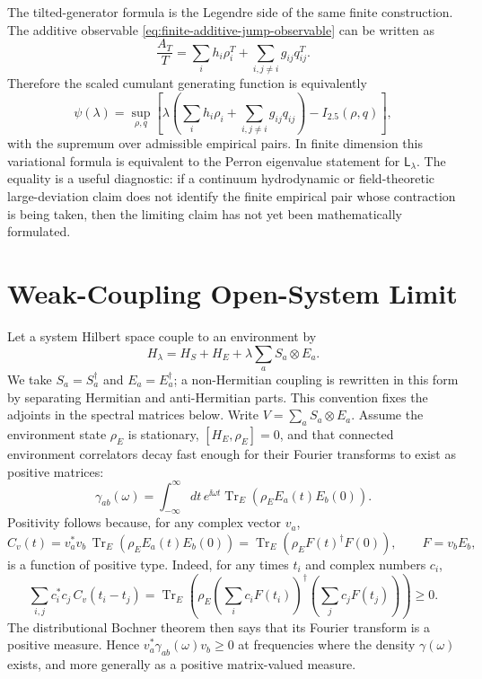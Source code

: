 The tilted-generator formula is the Legendre side of the same finite
construction.  The additive observable
\eqref{eq:finite-additive-jump-observable} can be written as
\[
  \frac{A_T}{T}
  =
  \sum_i h_i\rho_i^T
  +
  \sum_{i,j\ne i}g_{ij}q_{ij}^T .
\]
Therefore the scaled cumulant generating function is equivalently
\begin{equation}
  \psi(\lambda)
  =
  \sup_{\rho,q}
  \left[
    \lambda
    \left(
      \sum_i h_i\rho_i
      +
      \sum_{i,j\ne i}g_{ij}q_{ij}
    \right)
    -
    I_{2.5}(\rho,q)
  \right],
  \label{eq:tilted-generator-level-25-duality}
\end{equation}
with the supremum over admissible empirical pairs.  In finite dimension this
variational formula is equivalent to the Perron eigenvalue statement for
\(\mathsf L_\lambda\).  The equality is a useful diagnostic: if a continuum
hydrodynamic or field-theoretic large-deviation claim does not identify the
finite empirical pair whose contraction is being taken, then the limiting
claim has not yet been mathematically formulated.

\section{Weak-Coupling Open-System Limit}

Let a system Hilbert space couple to an environment by
\begin{equation}
  H_\lambda=H_S+H_E+\lambda\sum_a S_a\otimes E_a .
  \label{eq:open-system-total-hamiltonian}
\end{equation}
We take \(S_a=S_a^\dagger\) and \(E_a=E_a^\dagger\); a non-Hermitian
coupling is rewritten in this form by separating Hermitian and
anti-Hermitian parts.  This convention fixes the adjoints in the spectral
matrices below.  Write \(V=\sum_aS_a\otimes E_a\).
Assume the environment state \(\rho_E\) is stationary,
\([H_E,\rho_E]=0\), and that connected environment correlators decay
fast enough for their Fourier transforms to exist as positive matrices:
\begin{equation}
  \gamma_{ab}(\omega)
  =
  \int_{-\infty}^{\infty}dt\,
  e^{\ii\omega t}
  \operatorname{Tr}_E\!\left(
  \rho_E E_a(t)E_b(0)
  \right).
  \label{eq:open-system-bath-spectral-matrix}
\end{equation}
Positivity follows because, for any complex vector \(v_a\),
\[
  C_v(t)=
  v_a^*v_b\,\operatorname{Tr}_E\!\left(\rho_EE_a(t)E_b(0)\right)
  =
  \operatorname{Tr}_E\!\left(\rho_EF(t)^\dagger F(0)\right),
  \qquad F=v_bE_b ,
\]
is a function of positive type.  Indeed, for any times \(t_i\) and complex
numbers \(c_i\),
\[
  \sum_{i,j}c_i^*c_j\,C_v(t_i-t_j)
  =
  \operatorname{Tr}_E\!\left(
    \rho_E
    \left(\sum_i c_iF(t_i)\right)^\dagger
    \left(\sum_j c_jF(t_j)\right)
  \right)\ge0.
\]
The distributional Bochner theorem then says that its Fourier transform is a
positive measure.  Hence \(v_a^*\gamma_{ab}(\omega)v_b\ge0\) at frequencies
where the density \(\gamma(\omega)\) exists, and more generally as a positive
matrix-valued measure.

